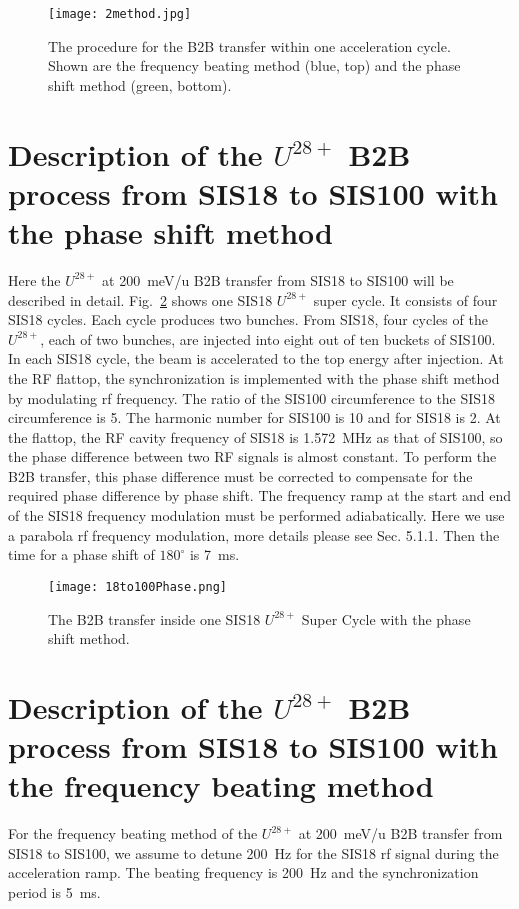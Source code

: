 \begin{figure}[H]
   \centering   
   \texttt{[image: 2method.jpg]}
   \caption{The procedure for the B2B transfer within one acceleration cycle. Shown are the frequency beating method (blue, top) and the phase shift method (green, bottom).}
   \label{2method}
\end{figure}

\section{Description of the $U^{28+}$ B2B process from SIS18 to SIS100 with the phase shift method}
Here the $U^{28+}$ at \SI{200}{meV/\atomicmassunit} B2B transfer from SIS18 to SIS100 will be described in detail. Fig.~\ref{18to100Phase} shows one SIS18 $U^{28+}$ super cycle. It consists of four SIS18 cycles. Each cycle produces two bunches. From SIS18, four cycles of the $U^{28+}$, each of two bunches, are injected into eight out of ten buckets of SIS100. In each SIS18 cycle, the beam is accelerated to the top energy after injection. At the RF flattop, the synchronization is implemented with the phase shift method by modulating rf frequency. 
The ratio of the SIS100 circumference to the SIS18 circumference is 5. The harmonic number for SIS100 is 10 and for SIS18 is 2. At the flattop, the RF cavity frequency of SIS18 is \SI{1.572}{MHz} as that of SIS100, so the phase difference between two RF signals is almost constant. To perform the B2B transfer, this phase difference must be corrected to compensate for the required phase difference by phase shift. The frequency ramp at the start and end of the SIS18 frequency modulation must be performed adiabatically. Here we use a parabola rf frequency modulation, more details please see Sec. 5.1.1.  Then the time for a phase shift of  $180^\circ$ is \SI{7}{\ms}.
\begin{figure}[H]
   \centering   
   \texttt{[image: 18to100Phase.png]}
   \caption{The B2B transfer inside one SIS18 $U^{28+}$ Super Cycle with the phase shift method.}
   \label{18to100Phase}
\end{figure}
\section{Description of the $U^{28+}$ B2B process from SIS18 to SIS100 with the frequency beating method}
For the frequency beating method of the $U^{28+}$ at \SI{200}{meV/\atomicmassunit} B2B transfer from SIS18 to SIS100, we assume to detune \SI{200}{Hz} for the SIS18 rf signal during the acceleration ramp. The beating frequency is \SI{200}{Hz} and the synchronization period is \SI{5}{\ms}.

